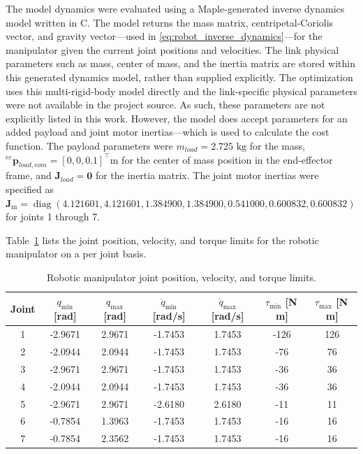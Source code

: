 The model dynamics were evaluated using a Maple-generated inverse dynamics model written in C. 
The model returns the mass matrix, centripetal-Coriolis vector, and gravity vector---used in  \cref{eq:robot_inverse_dynamics}---for the manipulator given the current joint positions and velocities.
The link physical parameters such as mass, center of mass, and the inertia matrix are stored within this generated dynamics model, rather than supplied explicitly.
The optimization uses this multi-rigid-body model directly and the link-specific physical parameters were not available in the project source.
As such, these parameters are not explicitly listed in this work.
However, the model does accept parameters for an added payload and joint motor inertias---which is used to calculate the cost function.
The payload parameters were $m_{load} = 2.725 \text{ kg}$ for the mass, ${}^{ee}\mathbf{p}_{load,com} = [0, 0, 0.1]^\top \text{m}$ for the center of mass position in the end-effector frame, and $\mathbf{J}_{load} = \mathbf{0}$ for the inertia matrix.
The joint motor inertias were specified as $\mathbf{J}_{\mathrm{m}} = \operatorname{diag}\left(4.121601, 4.121601, 1.384900, 1.384900, 0.541000, 0.600832, 0.600832\right)$ for joints 1 through 7.

Table~\cref{tab:robot_kindyn_limits} lists the joint position, velocity, and torque limits for the robotic manipulator on a per joint basis.

\begin{table}[htbp]
\centering
\caption{Robotic manipulator joint position, velocity, and torque limits.}
\begin{tabular}{c c c c c c c}
\hline
\label{tab:robot_kindyn_limits}
Joint &
$q_{\min}$ [rad] &
$q_{\max}$ [rad] &
$\dot{q}_{\min}$ [rad/s] &
$\dot{q}_{\max}$ [rad/s] &
$\tau_{\min}$ [N\,m] &
$\tau_{\max}$ [N\,m] \\
\hline
1 & -2.9671 & 2.9671 & -1.7453 & 1.7453 & -126 & 126 \\
2 & -2.0944 & 2.0944 & -1.7453 & 1.7453 & -76  & 76  \\
3 & -2.9671 & 2.9671 & -1.7453 & 1.7453 & -36  & 36  \\
4 & -2.0944 & 2.0944 & -1.7453 & 1.7453 & -36  & 36  \\
5 & -2.9671 & 2.9671 & -2.6180 & 2.6180 & -11  & 11  \\
6 & -0.7854 & 1.3963 & -1.7453 & 1.7453 & -16  & 16  \\
7 & -0.7854 & 2.3562 & -1.7453 & 1.7453 & -16  & 16  \\
\hline
\end{tabular}
\end{table}

